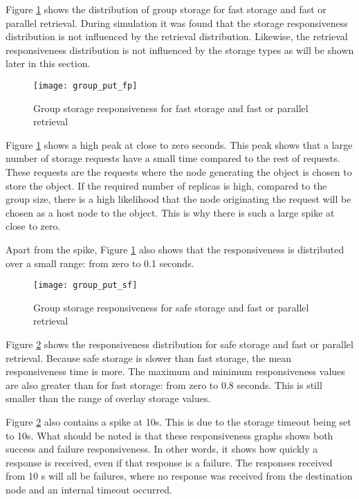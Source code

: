 Figure \ref{fig_group_put_fp} shows the distribution of group storage for fast storage and fast or parallel retrieval. During simulation it was found that the storage responsiveness distribution is not influenced by the retrieval distribution. Likewise, the retrieval responsiveness distribution is not influenced by the storage types as will be shown later in this section.

\begin{figure}[htbp]
 \centering
 \texttt{[image: group\_put\_fp]}
 \caption{Group storage responsiveness for fast storage and fast or parallel retrieval}
 \label{fig_group_put_fp}
\end{figure}
%
Figure \ref{fig_group_put_fp} shows a high peak at close to zero seconds. This peak shows that a large number of storage requests have a small time compared to the rest of requests. These requests are the requests where the node generating the object is chosen to store the object. If the required number of replicas is high, compared to the group size, there is a high likelihood that the node originating the request will be chosen as a host node to the object. This is why there is such a large spike at close to zero.

Apart from the spike, Figure \ref{fig_group_put_fp} also shows that the responsiveness is distributed over a small range: from zero to 0.1 seconds.

\begin{figure}[htbp]
 \centering
 \texttt{[image: group\_put\_sf]}
 \caption{Group storage responsiveness for safe storage and fast or parallel retrieval}
 \label{fig_group_put_sf}
\end{figure}
%
Figure \ref{fig_group_put_sf} shows the responsiveness distribution for safe storage and fast or parallel retrieval. Because safe storage is slower than fast storage, the mean responsiveness time is more. The maximum and minimum responsiveness values are also greater than for fast storage: from zero to 0.8 seconds. This is still smaller than the range of overlay storage values.

Figure \ref{fig_group_put_sf} also contains a spike at 10s. This is due to the storage timeout being set to 10s. What should be noted is that these responsiveness graphs shows both success and failure responsiveness. In other words, it shows how quickly a response is received, even if that response is a failure. The responses received from 10 s will all be failures, where no response was received from the destination node and an internal timeout occurred.

